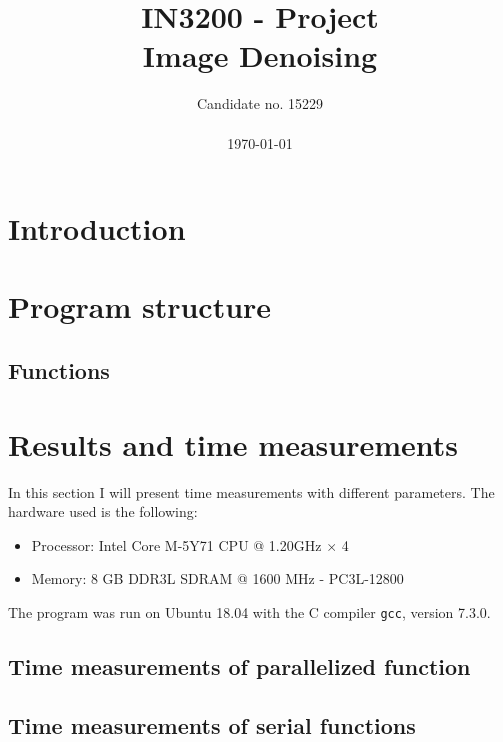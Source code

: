 \documentclass[10pt, a4paper]{amsart}
\title[Image Denoising]{IN3200 - Project \\ \large
Image Denoising}
\author[Candidate no. 15229]{Candidate no. 15229 \\ \\ \today}
\numberwithin{figure}{section}
\numberwithin{table}{section}
\begin{document}
\maketitle


\tableofcontents

\section{Introduction}


\section{Program structure}

\subsection{Functions}

\section{Results and time measurements}
In this section I will present time measurements with different parameters. The hardware used is the following:
\begin{itemize}
  \item Processor: Intel Core M-5Y71 CPU @ 1.20GHz $\times$ 4
  \item Memory: 8 GB DDR3L SDRAM @ 1600 MHz - PC3L-12800
\end{itemize}
The program was run on Ubuntu 18.04 with the C compiler \texttt{gcc}, version 7.3.0.


\subsection{Time measurements of parallelized function}
\subsection{Time measurements of serial functions}




\end{document}
